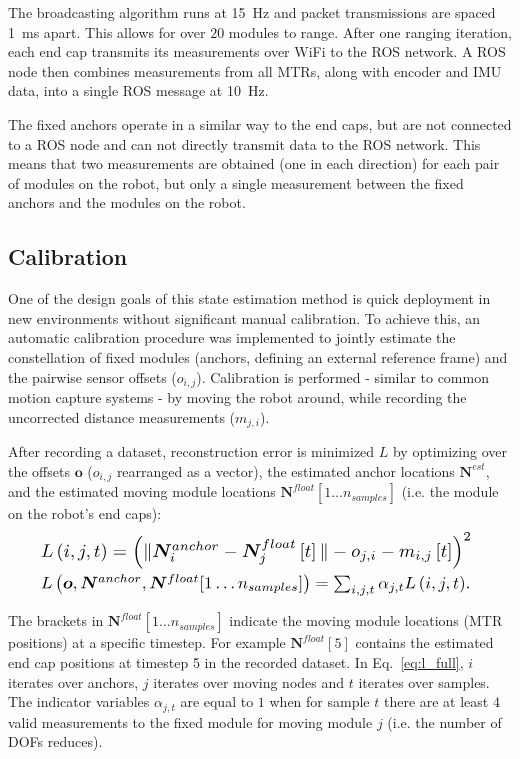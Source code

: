 {The broadcasting algorithm runs at \SI{15}{\hertz} and packet transmissions are spaced \SI{1}{\milli\second} apart.
This allows for over $20$ modules to range.
After one ranging iteration, each end cap transmits its measurements over WiFi to the ROS network. 
A ROS node then combines measurements from all MTRs, along with encoder and IMU data, into a single ROS message at  \SI{10}{\hertz}.

The fixed anchors operate in a similar way to the end caps, but are not connected to a ROS node and can not directly transmit data to the ROS network.
This means that two measurements are obtained (one in each direction) for each pair of modules on the robot, 
but only a single measurement between the fixed anchors and the modules on the robot.


\subsection{Calibration}
\label{txt:calib}
One of the design goals of this state estimation method is quick deployment in new environments without significant manual calibration.
To achieve this, an automatic calibration procedure was implemented to jointly estimate the constellation of fixed modules (anchors, defining an external reference frame) 
and the pairwise sensor offsets ($o_{i,j}$).
Calibration is performed - similar to common motion capture systems - by moving the robot around, while recording the uncorrected distance measurements ($m_{j,i}$).

After recording a dataset, reconstruction error is minimized $L$ by optimizing over the offsets $\bm{o}$ ($o_{i,j}$ rearranged as a vector), the estimated anchor locations $\bm{N}^{est}$, and the estimated moving module locations $\bm{N}^{float}[1\ldots n_{samples}]$ (i.e. the module on the robot's end caps):
\begin{align}
\resizebox{.91\hsize}{!}{$L\left(i,j,t\right) = \left( \|\bm{N}^{anchor}_i - \bm{N}^{float}_{j}\left[t\right]\|-o_{j,i} - m_{i,j}\left[t\right] \right)^2$ \label{eq:l_single}}\\
\resizebox{.91\hsize}{!}{$L\left(\bm{o},\bm{N}^{anchor},\bm{N}^{float}[1\ldots n_{samples}]\right) = \sum_{i,j,t}\alpha_{j,t}L\left(i,j,t\right)$. \label{eq:l_full}}
\end{align}

The brackets in $\bm{N}^{float}[1\ldots n_{samples}]$ indicate the moving module locations (MTR positions) at a specific timestep. 
For example $\bm{N}^{float}[5]$ contains the estimated end cap positions at timestep 5 in the recorded dataset.
In Eq.~\ref{eq:l_full}, $i$ iterates over anchors, $j$ iterates over moving nodes and $t$ iterates over samples.
The indicator variables $\alpha_{j,t}$ are equal to $1$ when for sample $t$ there are at least $4$ valid measurements to the fixed module for moving module $j$ (i.e. the number of DOFs reduces).

}
